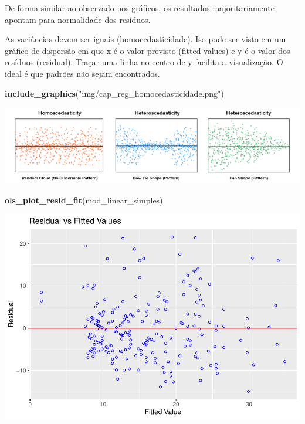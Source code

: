 \documentclass[
]{book}
\newenvironment{Shaded}{\begin{snugshade}}{\end{snugshade}}
\newcommand{\KeywordTok}[1]{\textcolor[rgb]{0.13,0.29,0.53}{\textbf{#1}}}
\newcommand{\NormalTok}[1]{#1}
\newcommand{\StringTok}[1]{\textcolor[rgb]{0.31,0.60,0.02}{#1}}
\begin{document}
De forma similar ao observado nos gráficos, os resultados majoritariamente apontam para normalidade dos resíduos.

As variâncias devem ser iguais (homocedasticidade). Iso pode ser visto em um gráfico de dispersão em que x é o valor previsto (fitted values) e y é o valor dos resíduos (residual). Traçar uma linha no centro de y facilita a visualização. O ideal é que padrões não sejam encontrados.

\begin{Shaded}
\begin{Highlighting}[]
\KeywordTok{include_graphics}\NormalTok{(}\StringTok{"img/cap_reg_homocedasticidade.png"}\NormalTok{)}
\end{Highlighting}
\end{Shaded}

\begin{center}\includegraphics{img/cap_reg_homocedasticidade} \end{center}

\begin{Shaded}
\begin{Highlighting}[]
\KeywordTok{ols_plot_resid_fit}\NormalTok{(mod_linear_simples)}
\end{Highlighting}
\end{Shaded}

\begin{center}\includegraphics{gitbook-demo_files/figure-latex/unnamed-chunk-108-1} \end{center}
\end{document}
